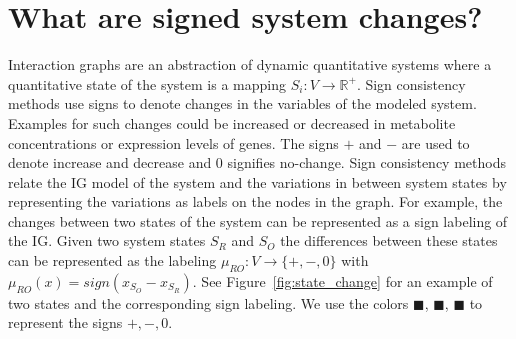\section*{What are signed system changes?}

Interaction graphs are an abstraction of dynamic
 quantitative systems where a quantitative state of the system is a mapping 
 $S_i : V \rightarrow \mathbb{R}^+$.
Sign consistency methods use signs to denote changes in the variables of the modeled system. 
Examples for such changes could be increased or decreased in metabolite concentrations or expression levels of genes.
The signs $\plus$ and $\minus$ are used to denote increase and decrease and 0 signifies no-change.
Sign consistency methods relate the IG model of the system and the variations in between system states
 by representing the variations as labels on the nodes in the graph. 
For example, the changes between two states of the system 
 can be represented as a sign labeling of the IG. 
Given two system states $S_R$ and $S_O$
 the differences between these states can be represented as the labeling $\mu_{RO} : V \rightarrow \{\plus, \minus, 0\}$ with
$\mu_{RO}(x) = sign(x_{S_O} - x_{S_R})$.
See Figure~\ref{fig:state_change} for an example of two states and the corresponding sign labeling.
We use the colors 
 \textcolor{edge_green}{$\blacksquare$},
 \textcolor{edge_red}{$\blacksquare$},
 \textcolor{edge_blue}{$\blacksquare$}
 to represent the signs $\plus, \minus, 0$.

